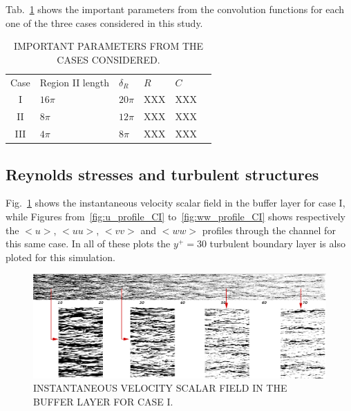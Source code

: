\documentclass[twocolumn,10pt]{asme2e}
\begin{document}
Tab.~\ref{table_conv} shows the important parameters from the convolution functions for each one of the three cases considered in this study.

\begin{table}[t]
\caption{IMPORTANT PARAMETERS FROM THE CASES CONSIDERED.}
\begin{center}
\centering
\label{table_conv}
\begin{tabular}{c l l l l l}
& & & & \\ %
\hline
Case	&	Region II length	&	\({\delta}_R\)	&	\(R\)	&	\(C\) \\
\hline
I	&	        \(16{\pi}\)	&	\(20{\pi}\)	&	XXX	&	XXX \\
II	&	        \(8{\pi}\)		&	\(12{\pi}\)	&	XXX	&	XXX \\
III	&	        \(4{\pi}\)		&	\(8{\pi}\)	&	XXX	&	XXX \\
\hline
\end{tabular}
\end{center}
\end{table}

\subsection*{Reynolds stresses and turbulent structures}

Fig.~\ref{fig:velocity_CI} shows the instantaneous velocity scalar field in the buffer layer for case I, while Figures from~\ref{fig:u_profile_CI} to~\ref{fig:ww_profile_CI} shows respectively the \(<u>\), \(<uu>\), \(<vv>\) and  \(<ww>\) profiles through the channel for this same case. In all of these plots the \(y^+=30\) turbulent boundary layer is also ploted for this simulation.

\begin{figure}[h]

	\includegraphics[width=\textwidth]{streaks.pdf}
	\caption{INSTANTANEOUS VELOCITY SCALAR FIELD IN THE BUFFER LAYER FOR CASE I.}
	\label{fig:velocity_CI}
\end{figure}
\end{document}
